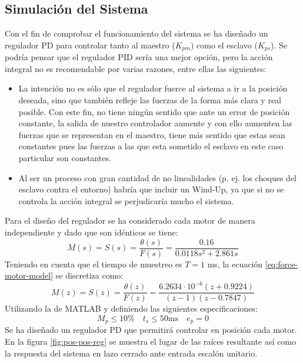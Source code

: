 \subsection{Simulación del Sistema}
\label{sub:pos-pos-sim}
Con el fin de comprobar el funcionamiento del sistema se ha diseñado un regulador PD para controlar tanto al maestro ($K_{pm}$) como el esclavo ($K_{ps}$). Se podría pensar que el regulador PID sería una mejor opción, pero la acción integral no es recomendable por varias razones, entre ellas las siguientes:
\begin{itemize}
\item La intención no es sólo que el regulador fuerce al sistema a ir a la posición deseada, sino que también refleje las fuerzas de la forma más clara y real posible. Con este fin, no tiene ningún sentido que ante un error de posición constante, la salida de nuestro controlador aumente y con ello aumenten las fuerzas que se representan en el maestro, tiene más sentido que estas sean constantes pues las fuerzas a las que esta sometido el esclavo en este caso particular son constantes.
\item Al ser un proceso con gran cantidad de no linealidades (p. ej. los choques del esclavo contra el entorno) habría que incluir un Wind-Up, ya que si no se controla la acción integral se perjudicaría mucho el sistema.
\end{itemize}
Para el diseño del regulador se ha considerado cada motor de manera independiente y dado que son idénticos se tiene:
\begin{equation}
M(s) = S(s) = \dfrac{\theta(s)}{F(s)} = \dfrac{0.16}{0.0118 s^2 + 2.861 s}
\label{eq:force-motor-model}
\end{equation}
Teniendo en cuenta que el tiempo de muestreo es $T = 1$ ms, la ecuación \eqref{eq:force-motor-model} se discretiza como:
\begin{equation}
M(z) = S(z) = \dfrac{\theta(z)}{F(z)} = \dfrac{6.2634\cdot 10^{-6}(z+0.9224)}{(z-1)(z-0.7847)}
\end{equation}
Utilizando la  de MATLAB y definiendo las siguientes especificaciones:
\begin{equation*}
M_p \leq 10\% \quad t_s \leq 50 \mbox{ms} \quad e_p = 0
\end{equation*}
Se ha diseñado un regulador PD que permitirá controlar en posición cada motor. En la figura \ref{fig:pos-pos-reg} se muestra el lugar de las raíces resultante así como la respuesta del sistema en lazo cerrado ante entrada escalón unitario.
